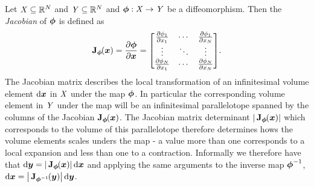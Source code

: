 Let $\mathit{X} \subseteq \mathbb{R}^N$ and $\mathit{Y} \subseteq \mathbb{R}^N$ and $\boldsymbol{\phi} : \mathit{X} \to \mathit{Y}$ be a diffeomorphism. Then the \emph{Jacobian} of $\boldsymbol{\phi}$ is defined as
\begin{equation}
  \jacob{\vct{\phi}}{\vct{x}} = \pd{\vct{\phi}}{\vct{x}} =
  \begin{bmatrix}
    \pd{\phi_1}{x_1} & \cdots & \pd{\phi_1}{x_N}\\
    \vdots & \ddots & \vdots \\
    \pd{\phi_N}{x_1} & \cdots & \pd{\phi_N}{x_N}
  \end{bmatrix}.
\end{equation}
The Jacobian matrix describes the local transformation of an infinitesimal volume element $\mathrm{d}\boldsymbol{x}$ in $\mathit{X}$ under the map $\boldsymbol{\phi}$. In particular the corresponding volume element in $\mathit{Y}$ under the map will be an infinitesimal parallelotope spanned by the columns of the Jacobian $\jacob{\vct{\phi}}{\vct{x}}$. The Jacobian matrix determinant $\left|\,\jacob{\vct{\phi}}{\vct{x}}\right|$ which corresponds to the volume of this parallelotope therefore determines hows the volume elements scales unders the map - a value more than one corresponds to a local expansion and less than one to a contraction. Informally we therefore have that $\dr\vct{y} = \left|\,\jacob{\vct{\phi}}{\vct{x}}\right|\,\dr\vct{x}$ and applying the same arguments to the inverse map $\boldsymbol{\phi}^{-1}$, $\dr\vct{x} = \left|\,\jacob{\vct{\phi}^{-1}}{\vct{y}}\right|\,\dr\vct{y}$.

